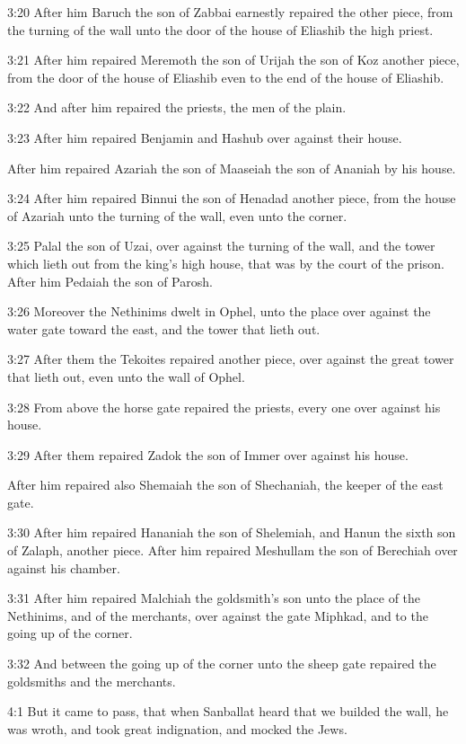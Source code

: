 3:20 After him Baruch the son of Zabbai earnestly repaired the other
piece, from the turning of the wall unto the door of the house of
Eliashib the high priest.

3:21 After him repaired Meremoth the son of Urijah the son of Koz
another piece, from the door of the house of Eliashib even to the end
of the house of Eliashib.

3:22 And after him repaired the priests, the men of the plain.

3:23 After him repaired Benjamin and Hashub over against their house.

After him repaired Azariah the son of Maaseiah the son of Ananiah by
his house.

3:24 After him repaired Binnui the son of Henadad another piece, from
the house of Azariah unto the turning of the wall, even unto the
corner.

3:25 Palal the son of Uzai, over against the turning of the wall, and
the tower which lieth out from the king's high house, that was by the
court of the prison. After him Pedaiah the son of Parosh.

3:26 Moreover the Nethinims dwelt in Ophel, unto the place over
against the water gate toward the east, and the tower that lieth out.

3:27 After them the Tekoites repaired another piece, over against the
great tower that lieth out, even unto the wall of Ophel.

3:28 From above the horse gate repaired the priests, every one over
against his house.

3:29 After them repaired Zadok the son of Immer over against his
house.

After him repaired also Shemaiah the son of Shechaniah, the keeper of
the east gate.

3:30 After him repaired Hananiah the son of Shelemiah, and Hanun the
sixth son of Zalaph, another piece. After him repaired Meshullam the
son of Berechiah over against his chamber.

3:31 After him repaired Malchiah the goldsmith's son unto the place of
the Nethinims, and of the merchants, over against the gate Miphkad,
and to the going up of the corner.

3:32 And between the going up of the corner unto the sheep gate
repaired the goldsmiths and the merchants.

4:1 But it came to pass, that when Sanballat heard that we builded the
wall, he was wroth, and took great indignation, and mocked the Jews.

